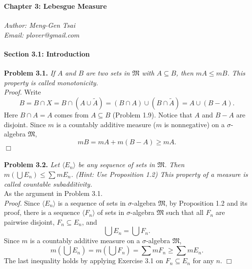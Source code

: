 \documentclass{article}
\begin{document}
\textbf{\Large Chapter 3: Lebesgue Measure} \\\\



\emph{Author: Meng-Gen Tsai} \\
\emph{Email: plover@gmail.com} \\\\



\textbf{\large Section 3.1: Introduction} \\\\



\textbf{Problem 3.1.}
\emph{If $A$ and $B$ are two sets in $\mathfrak{M}$ with
$A \subseteq B$, then $mA \leq mB$.
This property is called monotonicity.} \\

\emph{Proof.}
Write
$$B
= B \cap X
= B \cap (A \cup \widetilde{A})
= (B \cap A) \cup (B \cap \widetilde{A})
= A \cup (B - A).$$
Here $B \cap A = A$ comes from $A \subseteq B$ (Problem 1.9).
Notice that $A$ and $B - A$ are disjoint.
Since $m$ is a countably additive measure ($m$ is nonnegative)
on a $\sigma$-algebra $\mathfrak{M}$,
$$mB = mA + m(B-A) \geq mA.$$
$\Box$ \\\\



\textbf{Problem 3.2.}
\emph{Let $\langle E_n \rangle$ be any sequence of sets in $\mathfrak{M}$.
Then $m(\bigcup E_n) \leq \sum mE_n$. (Hint: Use Proposition 1.2)
This property of a measure is called countable subadditivity.} \\

As the argument in Problem 3.1. \\

\emph{Proof.}
Since $\langle E_n \rangle$ is a sequence of sets in $\sigma$-algebra $\mathfrak{M}$,
by Proposition 1.2 and its proof,
there is a sequence $\langle F_n \rangle$ of sets in $\sigma$-algebra $\mathfrak{M}$
such that all $F_n$ are pairwise disjoint, $F_n \subseteq E_n$, and
$$\bigcup E_n = \bigcup F_n.$$
Since $m$ is a countably additive measure
on a $\sigma$-algebra $\mathfrak{M}$,
$$m\left( \bigcup E_n \right)
= m\left( \bigcup F_n \right)
= \sum mF_n
\geq \sum mE_n.$$
The last inequality holds by applying Exercise 3.1 on $F_n \subseteq E_n$ for any $n$.
$\Box$ \\\\
\end{document}
